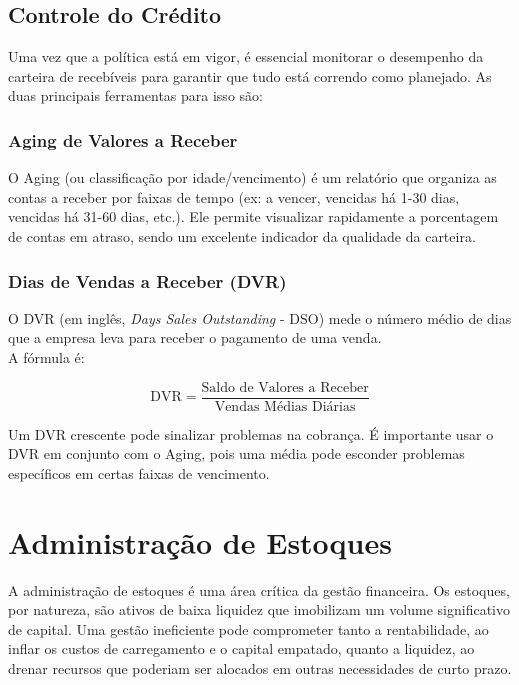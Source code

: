 \documentclass[
  a4paper,
]{book}
\begin{document}
\section{Controle do Crédito}\label{controle-do-cruxe9dito}

Uma vez que a política está em vigor, é essencial monitorar o desempenho
da carteira de recebíveis para garantir que tudo está correndo como
planejado. As duas principais ferramentas para isso são:

\subsection{Aging de Valores a
Receber}\label{aging-de-valores-a-receber}

O Aging (ou classificação por idade/vencimento) é um relatório que
organiza as contas a receber por faixas de tempo (ex: a vencer, vencidas
há 1-30 dias, vencidas há 31-60 dias, etc.). Ele permite visualizar
rapidamente a porcentagem de contas em atraso, sendo um excelente
indicador da qualidade da carteira.

\subsection{Dias de Vendas a Receber
(DVR)}\label{dias-de-vendas-a-receber-dvr}

O DVR (em inglês, \emph{Days Sales Outstanding} - DSO) mede o número
médio de dias que a empresa leva para receber o pagamento de uma
venda.\\
A fórmula é:

\[\text{DVR} = \frac{\text{Saldo de Valores a Receber}}{\text{Vendas Médias Diárias}}\]

Um DVR crescente pode sinalizar problemas na cobrança. É importante usar
o DVR em conjunto com o Aging, pois uma média pode esconder problemas
específicos em certas faixas de vencimento.


\chapter{Administração de Estoques}\label{sec-estoque}

A administração de estoques é uma área crítica da gestão financeira. Os
estoques, por natureza, são ativos de baixa liquidez que imobilizam um
volume significativo de capital. Uma gestão ineficiente pode comprometer
tanto a rentabilidade, ao inflar os custos de carregamento e o capital
empatado, quanto a liquidez, ao drenar recursos que poderiam ser
alocados em outras necessidades de curto prazo.
\end{document}
